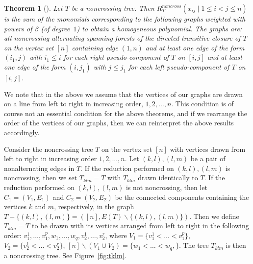 \documentclass[10pt]{amsart}
\newtheorem{theo}{Theorem}[section]
\theoremstyle{definition}
\numberwithin{equation}{section}
\newcommand*\+{\smash{\lower2pt\hbox{\rlap{\vrule height14pt}}\raise2pt\hbox{\rlap{\hskip-3pt \vrule height.4pt depth0pt width14.7pt}}}}
\begin{document}
\begin{theo}[\cite{root1}]\label{gen:non}
Let $T$ be a noncrossing tree. Then $R^{noncross}_T(x_{ij} \mid 1\leq i<j\leq n)$ is the sum of the monomials corresponding to the following graphs weighted with powers of $\beta$ (of degree~$1$) to obtain a homogeneous polynomial. The graphs are: all
noncrossing alternating spanning forests of the directed transitive closure of $T$ on the vertex set $[n]$ containing edge $(1, n)$ and at least one edge of the form $(i_1, j)$ with $i_1\leq i$ for each right pseudo-component of $T$ on $[i, j]$ and at least one edge of the form $(i, j_1)$ with $j\leq j_1$ for each left pseudo-component of $T$ on $[i, j]$. 
\end{theo}

We note that in the above we assume that the vertices of our graphs are drawn on a line from left to right in increasing order, $1, 2, \dots, n.$ This condition is of course not an essential condition for the above theorems, and if we rearrange the order of the vertices of our graphs, then we can reinterpret the above results accordingly.

Consider the noncrossing tree $T$ on the vertex set $[n]$ with vertices drawn from left to right in increasing order $1, 2,\dots, n$. Let $(k,l), (l,m)$ be a pair of nonalternating edges in $T$. If the reduction performed on $(k,l), (l,m)$ is noncrossing, then we set $T_{klm}=T$ with $T_{klm}$ drawn identically to $T$. If the reduction performed on $(k,l), (l,m)$ is not noncrossing, then let $C_1=(V_1, E_1)$ and $C_2=(V_2, E_2)$ be the connected components containing the vertices $k$ and $m$, respectively, in the graph $T-\{(k,l), (l,m)\}=([n], E(T)\backslash \{(k,l), (l,m)\})$. Then we define $T_{klm}=T$ to be drawn with its vertices arranged from left to right in the following order: $v_1^1, \dots, v_1^p, w_1, \dots, w_q, v_2^1, \dots, v_2^r$, where $V_1=\{v_1^1< \dots< v_1^p\}$, $V_2=\{v_2^1< \dots< v_2^r\}$, $ [n]\backslash (V_1 \cup V_2)=\{w_1< \dots< w_q,\}.$ The tree $T_{klm}$ is then a noncrossing tree. See Figure~\ref{fig:tklm}.
\end{document}
